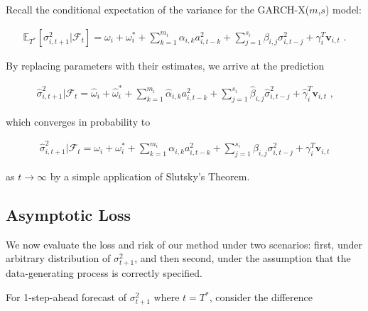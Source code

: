 \documentclass[11pt,3p,review,authoryear]{elsarticle}
\newcommand{\x}{\textbf{v}}
\def\E{\mathbb{E}} %
\theoremstyle{definition}
\newenvironment{proof-of-proposition}[1][{}]{\noindent{\bf
    Proof of Proposition {#1}}
  \hspace*{.5em}}{\qed\bigskip\\}
\begin{document}
\begin{proof-of-proposition}
Recall the conditional expectation of the variance for the GARCH-X($m$,$s$) model:

\begin{align*}
\E_{T^{*}}[\sigma^{2}_{i,t+1}|\mathcal{F}_{t}] = \omega_{i} + \omega^{*}_i + \sum^{m_{i}}_{k=1}\alpha_{i,k}a^{2}_{i,t-k} + \sum_{j=1}^{s_{i}}\beta_{i,j}\sigma_{i,t-j}^{2} + \gamma_{i}^{T} \x_{i,t} \text{ .}
\end{align*}

By replacing parameters with their estimates, we arrive at the prediction 

\begin{align*}
\hat\sigma^{2}_{i,t+1}|\mathcal{F}_{t} = \hat\omega_{i} + \hat\omega^{*}_i + \sum^{m_{i}}_{k=1}\hat\alpha_{i,k}a^{2}_{i,t-k} + \sum_{j=1}^{s_{i}}\hat\beta_{i,j}\hat\sigma_{i,t-j}^{2} + \hat\gamma_{i}^{T} \x_{i,t} \text { ,}
\end{align*}

which converges in probability to 

\begin{align*}
  \hat\sigma^{2}_{i,t+1}|\mathcal{F}_{t} = \omega_{i} + \omega^{*}_i + \sum^{m_{i}}_{k=1}\alpha_{i,k}a^{2}_{i,t-k} + \sum_{j=1}^{s_{i}}\beta_{i,j}\sigma_{i,t-j}^{2} + \gamma_{i}^{T} \x_{i,t}
  \end{align*}

as $t\rightarrow\infty$ by a simple application of Slutsky's Theorem.

\end{proof-of-proposition}

\subsection{Asymptotic Loss}

We now evaluate the loss and risk of our method under two scenarios: first, under arbitrary distribution of $\sigma^{2}_{t+1}$, and then second, under the assumption that the data-generating process is correctly specified.

For 1-step-ahead forecast of $\sigma^{2}_{t+1}$ where $t=T^{*}$, consider the difference 
\end{document}
